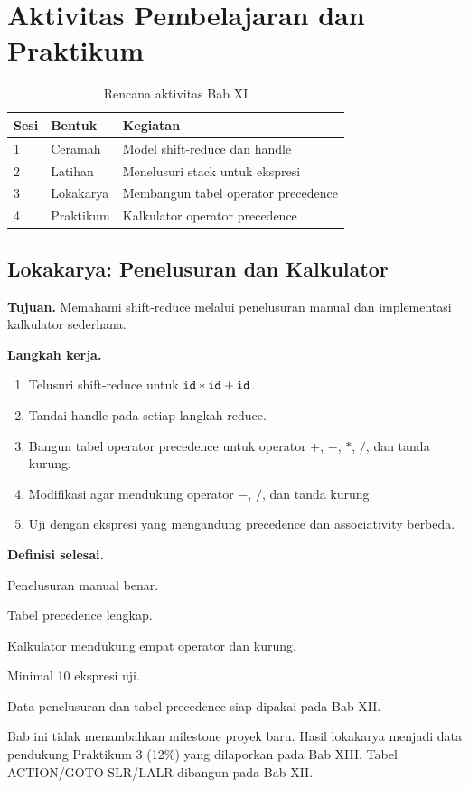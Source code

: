 \section*{Aktivitas Pembelajaran dan Praktikum}

\begin{table}[H]
\centering
\caption{Rencana aktivitas Bab XI}
\label{tab:ch11-aktivitas}
\begin{tabularx}{\textwidth}{@{}llX@{}}
\toprule
\textbf{Sesi} & \textbf{Bentuk} & \textbf{Kegiatan} \\
\midrule
1 & Ceramah & Model shift-reduce dan handle \\
2 & Latihan & Menelusuri stack untuk ekspresi \\
3 & Lokakarya & Membangun tabel operator precedence \\
4 & Praktikum & Kalkulator operator precedence \\
\bottomrule
\end{tabularx}
\end{table}

\subsection*{Lokakarya: Penelusuran dan Kalkulator}
\textbf{Tujuan.} Memahami shift-reduce melalui penelusuran manual
dan implementasi kalkulator sederhana.

\textbf{Langkah kerja.}
\begin{enumerate}[label=\arabic*.,leftmargin=*]
  \item Telusuri shift-reduce untuk \(\texttt{id} * \texttt{id} +
        \texttt{id}\).
  \item Tandai handle pada setiap langkah reduce.
  \item Bangun tabel operator precedence untuk operator
        \(+\), \(-\), \(*\), \(/\), dan tanda kurung.
  \item Modifikasi  agar mendukung operator
        \(-\), \(/\), dan tanda kurung.
  \item Uji dengan ekspresi yang mengandung precedence dan
        associativity berbeda.
\end{enumerate}

\textbf{Definisi selesai.}
\begin{checklist}
  \item Penelusuran manual benar.
  \item Tabel precedence lengkap.
  \item Kalkulator mendukung empat operator dan kurung.
  \item Minimal 10 ekspresi uji.
  \item Data penelusuran dan tabel precedence siap dipakai pada
        Bab XII.
\end{checklist}

Bab ini tidak menambahkan milestone proyek baru. Hasil lokakarya
menjadi data pendukung Praktikum 3 (12\%) yang dilaporkan pada
Bab XIII. Tabel ACTION/GOTO SLR/LALR dibangun pada Bab XII.

